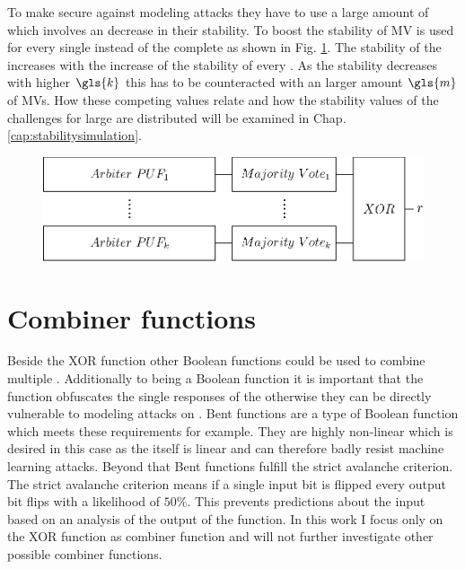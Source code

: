 To make \xpuf secure against modeling attacks they have to use a large amount of \apufs which involves an decrease in their stability.
To boost the stability of \xpufs \ac{MV} is used for every single \apuf instead of the complete \xpuf as shown in Fig. \ref{fig:majorityxorarbiter}.
The stability of the \xpuf increases with the increase of the stability of every \mpuf.
As the stability decreases with higher $\gls{k}$ this has to be counteracted with an larger amount $\gls{m}$ of \acp{MV}.
How these competing values relate and how the stability values of the challenges for large \mxpufs are distributed will be examined in Chap. \ref{cap:stabilitysimulation}.

\begin{figure}[ht]
\centering
\includegraphics[width=1.00\textwidth]{images/majority_xor_arbiter.eps}
\caption{\mxpuf}
\label{fig:majorityxorarbiter}
\end{figure}


\section{Combiner functions}
\label{sec:combinerfunctions}

Beside the \ac{XOR} function other Boolean functions could be used to combine multiple \apuf.
Additionally to being a Boolean function it is important that the function obfuscates the single responses of the \apufs otherwise they can be directly vulnerable to modeling attacks on \apufs.
Bent functions are a type of Boolean function which meets these requirements for example. %
They are highly non-linear which is desired in this case as the \apuf itself is linear and can therefore badly resist machine learning attacks.
Beyond that Bent functions fulfill the strict avalanche criterion.
The strict avalanche criterion means if a single input bit is flipped every output bit flips with a likelihood of $50 \%$.
This prevents predictions about the input based on an analysis of the output of the function.
In this work I focus only on the \ac{XOR} function as combiner function and will not further investigate other possible combiner functions.

